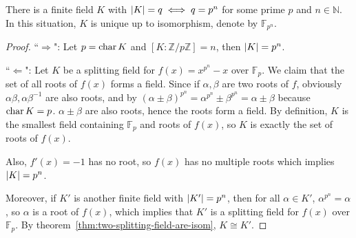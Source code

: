 \begin{theorem} \label{thm:size-of-finite-field}
  There is a finite field $K$ with $\lvert K\rvert = q \iff q = p^n$ for some prime $p$ and $n \in \mathbb{N}$.
  In this situation, $K$ is unique up to isomorphism, denote by $\mathbb{F}_{p^n}$.

  \begin{proof}
    ``$\Rightarrow$": Let $p = \operatorname{char} K$ and $[K : \mathbb{Z}/ p\mathbb{Z}] = n$, then $\lvert K\rvert = p^n$.

    ``$\Leftarrow$": Let $K$ be a splitting field for $f(x) = x^{p^n} - x$ over $\mathbb{F}_p$.
    We claim that the set of all roots of $f(x)$ forms a field. Since if $\alpha, \beta$ are
    two roots of $f$, obviously $\alpha \beta, \alpha \beta^{-1}$ are also roots,
    and by $(\alpha \pm \beta)^{p^n} = \alpha^{p^n} \pm \beta^{p^n} = \alpha \pm \beta$ because
    $\operatorname{char} K = p$.
    $\alpha \pm \beta$ are also roots, hence the roots form a field. By definition, $K$
    is the smallest field containing $\mathbb{F}_p$ and roots of $f(x)$, so
    $K$ is exactly the set of roots of $f(x)$.

    Also, $f'(x) = -1$ has no root, so $f(x)$ has no multiple roots which implies $\lvert K\rvert = p^n$.

    Moreover, if $K'$ is another finite field with $\lvert K'\rvert = p^n$, then for all $\alpha \in K'$,
    $\alpha^{p^n} = \alpha$, so $\alpha$ is a root of $f(x)$, which implies that $K'$ is
    a splitting field for $f(x)$ over $\mathbb{F}_p$. By theorem~\ref{thm:two-splitting-field-are-isom},
    $K \cong K'$.
  \end{proof}
\end{theorem}

